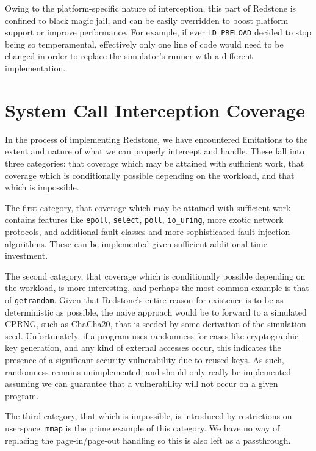 {Owing to the platform-specific nature of interception,
this part of Redstone is confined to black magic jail,
and can be easily overridden to boost platform support or improve performance.
For example,
if ever \texttt{LD\_PRELOAD} decided to stop being so temperamental,
effectively only one line of code would need to be changed in order to replace the simulator’s runner with a different implementation.

}

\section{\txtrsdust System Call Interception Coverage}

{\fontsize{12}{15}\selectfont 
In the process of implementing Redstone,
we have encountered limitations to the extent and nature of what we can properly intercept and handle.
These fall into three categories:
that coverage which may be attained with sufficient work,
that coverage which is conditionally possible depending on the workload,
and that which is impossible.

The first category,
that coverage which may be attained with sufficient work
contains features like \texttt{epoll}, \texttt{select}, \texttt{poll}, \texttt{io\_uring},
more exotic network protocols,
and additional fault classes and more sophisticated fault injection algorithms.
These can be implemented given sufficient additional time investment.

The second category,
that coverage which is conditionally possible depending on the workload,
is more interesting, and perhaps the most common example is that of \texttt{getrandom}.
Given that Redstone's entire reason for existence is to be as deterministic as possible,
the naive approach would be to forward to a simulated CPRNG, such as ChaCha20,
that is seeded by some derivation of the simulation seed.
Unfortunately, if a program uses randomness for cases like cryptographic key generation,
and any kind of external accesses occur,
this indicates the presence of a significant security vulnerability due to reused keys.
As such,
randomness remains unimplemented,
and should only really be implemented assuming we can guarantee that a vulnerability will not occur on a given program.

The third category,
that which is impossible,
is introduced by restrictions on userspace.
\texttt{mmap} is the prime example of this category.
We have no way of replacing the page-in/page-out handling so this is also left as a passthrough. 

}

